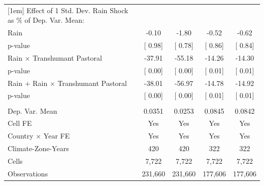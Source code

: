 {\begin{tabular}{l*{4}{c}}
[1em] Effect of 1 Std. Dev. Rain Shock as $\%$ of Dep. Var. Mean:&               &               &               &               \\
\hspace{15pt} Rain  & -0.10         & -1.80         & -0.52         & -0.62         \\
\hspace{15pt} p-value&[     0.98]         &[     0.78]         &[     0.86]         &[     0.84]         \\
[1em] \hspace{15pt} Rain $\times$ Transhumant Pastoral&-37.91         &-55.18         &-14.26         &-14.30         \\
\hspace{15pt} p-value&[     0.00]         &[     0.00]         &[     0.01]         &[     0.01]         \\
[1em]  \hspace{15pt} Rain $+$ Rain $\times$ Transhumant Pastoral&-38.01         &-56.97         &-14.78         &-14.92         \\
\hspace{15pt} p-value&[     0.00]         &[     0.00]         &[     0.01]         &[     0.01]         \\
\hline \\ Dep. Var. Mean&0.0351         &0.0253         &0.0845         &0.0842         \\
Cell FE             &   Yes         &   Yes         &   Yes         &   Yes         \\
Country $\times$ Year FE&   Yes         &   Yes         &   Yes         &   Yes         \\
Climate-Zone-Years  &   420         &   420         &   322         &   322         \\
Cells               & 7,722         & 7,722         & 7,722         & 7,722         \\
Observations        &231,660         &231,660         &177,606         &177,606         \\
\bottomrule
\end{tabular}
}
